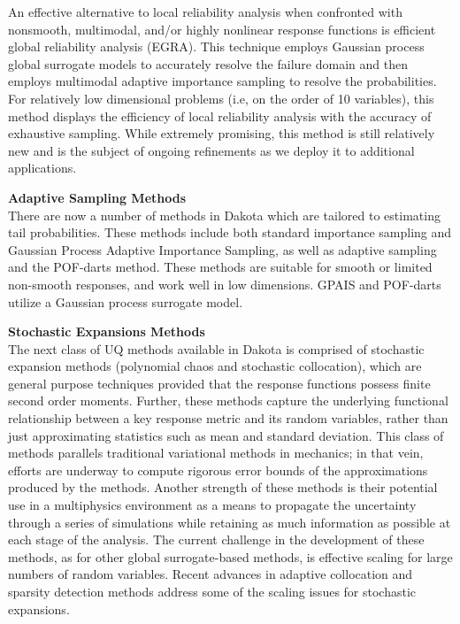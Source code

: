 An effective alternative to local reliability analysis when confronted
with nonsmooth, multimodal, and/or highly nonlinear response functions
is efficient global reliability analysis (EGRA). This technique
employs Gaussian process global surrogate models to accurately resolve
the failure domain and then employs multimodal adaptive importance
sampling to resolve the probabilities. For relatively low dimensional
problems (i.e, on the order of 10 variables), this method displays the
efficiency of local reliability analysis with the accuracy of
exhaustive sampling. While extremely promising, this method is still
relatively new and is the subject of ongoing refinements as we deploy
it to additional applications.

{\bf Adaptive Sampling Methods} \\
There are now a number of methods in Dakota which are tailored to 
estimating tail probabilities.
These methods include both standard importance sampling and 
Gaussian Process Adaptive Importance Sampling, as well as 
adaptive sampling and the POF-darts method. These methods 
are suitable for smooth or limited non-smooth responses, 
and work well in low dimensions. GPAIS and POF-darts utilize 
a Gaussian process surrogate model.  
 
{\bf Stochastic Expansions Methods} \\
The next class of UQ methods available in Dakota is comprised of
stochastic expansion methods (polynomial chaos and stochastic
collocation), which are general purpose techniques provided that the
response functions possess finite second order moments. Further, these
methods capture the underlying functional relationship between a key
response metric and its random variables, rather than just
approximating statistics such as mean and standard deviation. This
class of methods parallels traditional variational methods in
mechanics; in that vein, efforts are underway to compute rigorous
error bounds of the approximations produced by the methods. Another
strength of these methods is their potential use in a multiphysics
environment as a means to propagate the uncertainty through a series
of simulations while retaining as much information as possible at each
stage of the analysis. The current challenge in the development of
these methods, as for other global surrogate-based methods, is
effective scaling for large numbers of random variables. Recent
advances in adaptive collocation and sparsity detection methods
address some of the scaling issues for stochastic expansions.

